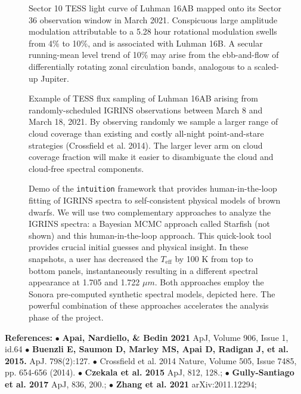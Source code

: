 \documentclass[11pt]{article}
\begin{document}
{\begin{figure}[ht!]
    \caption{Sector 10 TESS light curve of Luhman 16AB mapped onto its Sector 36 observation window in March 2021.  Conspicuous large amplitude modulation attributable to a 5.28 hour rotational modulation swells from 4\% to 10\%, and is associated with Luhman 16B.  A secular running-mean level trend of 10\% may arise from the ebb-and-flow of differentially rotating zonal circulation bands, analogous to a scaled-up Jupiter.}
\end{figure}

 
\begin{figure}[ht!]
    \caption{Example of TESS flux sampling of Luhman 16AB arising from randomly-scheduled IGRINS observations between March 8 and March 18, 2021.  By observing randomly we sample a larger range of cloud coverage than existing and costly all-night point-and-stare strategies (Crossfield et al. 2014).  The larger lever arm on cloud coverage fraction will make it easier to disambiguate the cloud and cloud-free spectral components.}
\end{figure}
    

 
\begin{figure}[ht!]

    \caption{Demo of the \texttt{intuition} framework that provides human-in-the-loop fitting of IGRINS spectra to self-consistent physical models of brown dwarfs.  We will use two complementary approaches to analyze the IGRINS spectra: a Bayesian MCMC approach called Starfish (not shown) and this human-in-the-loop approach.  This quick-look tool provides crucial initial guesses and physical insight.  In these snapshots, a user has decreased the $T_{\mathrm{eff}}$ by 100 K from top to bottom panels, instantaneously resulting in a different spectral appearance at 1.705 and 1.722 $\mu m$.  Both approaches employ the Sonora pre-computed synthetic spectral models, depicted here.  The powerful combination of these approaches accelerates the analysis phase of the project.}
\end{figure}

  

\setlength{\parindent}{0cm}
\textbf{References:}
{\footnotesize $\bullet$ \textbf{Apai, Nardiello, \& Bedin 2021} ApJ, Volume 906, Issue 1, id.64 
$\bullet$ \textbf{Buenzli E, Saumon D, Marley MS, Apai D, Radigan J, et al. 2015.} ApJ. 798(2):127. 
$\bullet$ Crossfield et al. 2014 Nature, Volume 505, Issue 7485, pp. 654-656 (2014).
$\bullet$ \textbf{Czekala et al. 2015} ApJ, 812, 128.; 
$\bullet$ \textbf{Gully-Santiago et al. 2017} ApJ, 836, 200.; 
$\bullet$ \textbf{Zhang et al. 2021} arXiv:2011.12294;}
\setlength{\parindent}{1cm}

}
\end{document}
